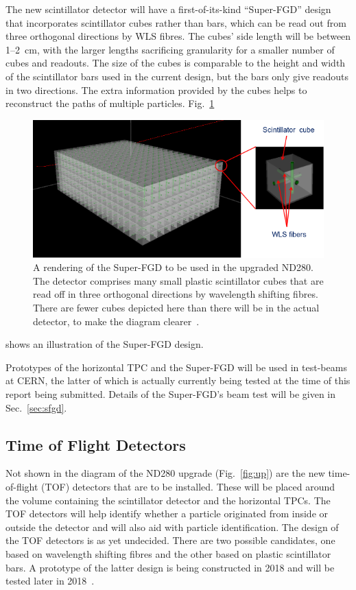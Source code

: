 \documentclass[aps,pra,12pt,notitlepage,tightenlines]{revtex4-1}
\begin{document}
The new scintillator detector will have a first-of-its-kind ``Super-FGD'' design that incorporates scintillator cubes rather than bars, which can be read out from three orthogonal directions by WLS fibres. The cubes' side length will be between 1--2~cm, with the larger lengths sacrificing granularity for a smaller number of cubes and readouts. The size of the cubes is comparable to the height and width of the scintillator bars used in the current design, but the bars only give readouts in two directions. The extra information provided by the cubes helps to reconstruct the paths of multiple particles. Fig.~\ref{fig:sfgd}
 \begin{figure}
  \includegraphics[scale=0.75]{SFGD.png}
  \caption{A rendering of the Super-FGD to be used in the upgraded ND280. The detector comprises many small plastic scintillator cubes that are read off in three orthogonal directions by wavelength shifting fibres. There are fewer cubes depicted here than there will be in the actual detector, to make the diagram clearer~\cite{Blondel:2299599}.}
  \label{fig:sfgd}
 \end{figure}
shows an illustration of the Super-FGD design.

Prototypes of the horizontal TPC and the Super-FGD will be used in test-beams at CERN, the latter of which is actually currently being tested at the time of this report being submitted. Details of the Super-FGD's beam test will be given in Sec.\ \ref{sec:sfgd}.

\subsection{Time of Flight Detectors}
Not shown in the diagram of the ND280 upgrade (Fig.\ \ref{fig:up}) are the new time-of-flight (TOF) detectors that are to be installed. These will be placed around the volume containing the scintillator detector and the horizontal TPCs. The TOF detectors will help identify whether a particle originated from inside or outside the detector and will also aid with particle identification. The design of the TOF detectors is as yet undecided. There are two possible candidates, one based on wavelength shifting fibres and the other based on plastic scintillator bars. A prototype of the latter design is being constructed in 2018 and will be tested later in 2018~\cite{Blondel:2299599}. 
\end{document}

